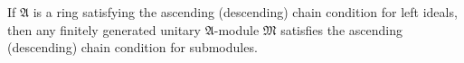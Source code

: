 If $\mathfrak{A}$ is a ring satisfying the ascending (descending) chain condition for left ideals, then any finitely generated unitary $\mathfrak{A}$-module $\mathfrak{M}$ satisfies the ascending (descending) chain condition for submodules.
